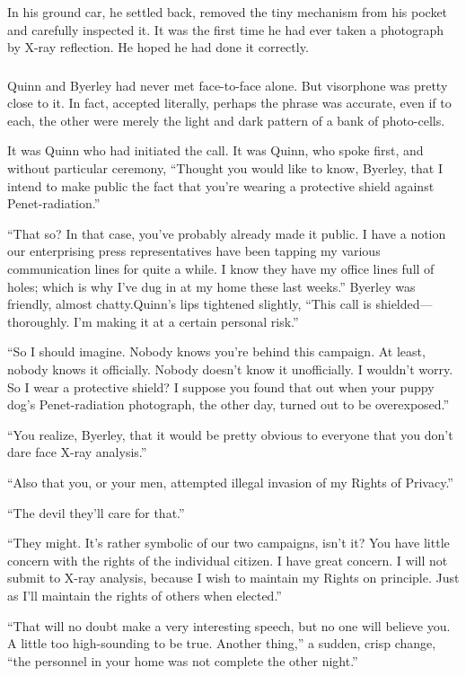 \documentclass[10pt,a5paper,twoside]{book}
\begin{document}
In his ground car, he settled back, removed the tiny mechanism from his pocket and carefully inspected it. It was the first time he had ever taken a photograph by X-ray reflection. He hoped he had done it correctly.

\subsubsection*{}
Quinn and Byerley had never met face-to-face alone. But visorphone was pretty close to it. In fact, accepted literally, perhaps the phrase was accurate, even if to each, the other were merely the light and dark pattern of a bank of photo-cells.

It was Quinn who had initiated the call. It was Quinn, who spoke first, and without particular ceremony, “Thought you would like to know, Byerley, that I intend to make public the fact that you’re wearing a protective shield against Penet-radiation.”

“That so? In that case, you’ve probably already made it public. I have a notion our enterprising press representatives have been tapping my various communication lines for quite a while. I know they have my office lines full of holes; which is why I’ve dug in at my home these last weeks.” Byerley was friendly, almost chatty.Quinn’s lips tightened slightly, “This call is shielded—thoroughly. I’m making it at a certain personal risk.”

“So I should imagine. Nobody knows you’re behind this campaign. At least, nobody knows it officially. Nobody doesn’t know it unofficially. I wouldn’t worry. So I wear a protective shield? I suppose you found that out when your puppy dog’s Penet-radiation photograph, the other day, turned out to be overexposed.”

“You realize, Byerley, that it would be pretty obvious to everyone that you don’t dare face X-ray analysis.”

“Also that you, or your men, attempted illegal invasion of my Rights of Privacy.”

“The devil they’ll care for that.”

“They might. It’s rather symbolic of our two campaigns, isn’t it? You have little concern with the rights of the individual citizen. I have great concern. I will not submit to X-ray analysis, because I wish to maintain my Rights on principle. Just as I’ll maintain the rights of others when elected.”

“That will no doubt make a very interesting speech, but no one will believe you. A little too high-sounding to be true. Another thing,” a sudden, crisp change, “the personnel in your home was not complete the other night.”
\end{document}
